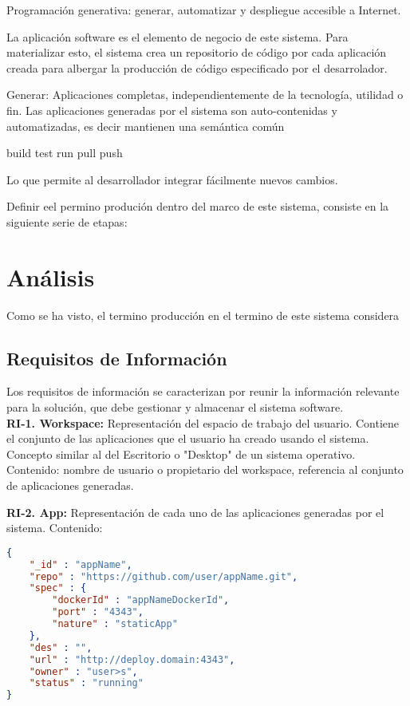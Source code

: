 \documentclass[a4paper,11pt]{book}
\begin{document}
Programación generativa: generar, automatizar  y despliegue accesible a Internet.


La aplicación software es el elemento de negocio de este sistema.  Para materializar esto, el sistema crea un repositorio de código por cada aplicación creada para albergar la producción de código especificado por  el desarrolador. 


Generar: Aplicaciones completas, independientemente de la tecnología, utilidad o fin. Las aplicaciones generadas por el sistema
son auto-contenidas y automatizadas, es decir mantienen una semántica común 

build
test
run
pull
push

Lo que permite al desarrollador integrar fácilmente nuevos cambios. 

Definir eel permino produción dentro del marco de este sistema, consiste en la siguiente serie de etapas:



\section{Análisis}

Como se ha visto, el termino producción en el termino de este sistema considera 

\subsection{Requisitos de Información }
Los requisitos de información se caracterizan por reunir la información relevante para la solución, que debe gestionar y almacenar el sistema software.\\

\textbf{RI-1. Workspace:} Representación del espacio de trabajo del usuario. Contiene el conjunto de las aplicaciones que el usuario ha creado usando el sistema. Concepto similar al del Escritorio o "Desktop" de un sistema operativo. 
Contenido: nombre de usuario o propietario del workspace, referencia al conjunto de aplicaciones generadas.


\textbf{RI-2. App:} Representación de cada uno de las aplicaciones generadas por el sistema. 
Contenido:
\begin{lstlisting}[language=json,firstnumber=1]
{
    "_id" : "appName",
    "repo" : "https://github.com/user/appName.git",
    "spec" : {
        "dockerId" : "appNameDockerId",
        "port" : "4343",
        "nature" : "staticApp"
    },
    "des" : "",
    "url" : "http://deploy.domain:4343",
    "owner" : "user>s",
    "status" : "running"
}
\end{lstlisting}
\end{document}
